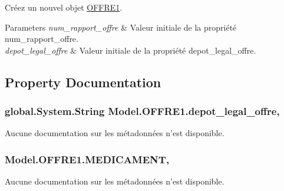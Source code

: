 Créez un nouvel objet \hyperlink{class_model_1_1_o_f_f_r_e1}{O\-F\-F\-R\-E1}. 


\begin{DoxyParams}{Parameters}
{\em num\-\_\-rapport\-\_\-offre} & Valeur initiale de la propriété num\-\_\-rapport\-\_\-offre.\\
\hline
{\em depot\-\_\-legal\-\_\-offre} & Valeur initiale de la propriété depot\-\_\-legal\-\_\-offre.\\
\hline
\end{DoxyParams}


\subsection{Property Documentation}
\hypertarget{class_model_1_1_o_f_f_r_e1_abd3803160cf8cdb50d1d357bf379d82b}{
\subsubsection[{depot\-\_\-legal\-\_\-offre}]{\setlength{\rightskip}{0pt plus 5cm}global.\-System.\-String Model.\-O\-F\-F\-R\-E1.\-depot\-\_\-legal\-\_\-offre\hspace{0.3cm}{\ttfamily [get]}, {\ttfamily [set]}}}\label{class_model_1_1_o_f_f_r_e1_abd3803160cf8cdb50d1d357bf379d82b}


Aucune documentation sur les métadonnées n'est disponible. 

\hypertarget{class_model_1_1_o_f_f_r_e1_a2c69f629593dcb56e64724980441dfe6}{
\subsubsection[{M\-E\-D\-I\-C\-A\-M\-E\-N\-T}]{ Model.\-O\-F\-F\-R\-E1.\-M\-E\-D\-I\-C\-A\-M\-E\-N\-T\hspace{0.3cm}{\ttfamily [get]}, {\ttfamily [set]}}}\label{class_model_1_1_o_f_f_r_e1_a2c69f629593dcb56e64724980441dfe6}


Aucune documentation sur les métadonnées n'est disponible. 

